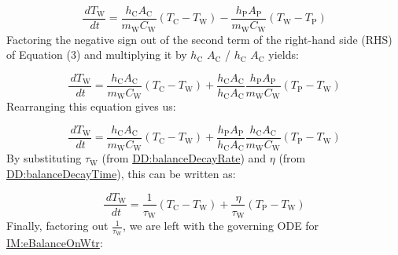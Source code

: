 \documentclass[12pt]{article}
\begin{document}
\begin{displaymath}
\frac{\,d{T_{\text{W}}}}{\,dt}=\frac{{h_{\text{C}}} {A_{\text{C}}}}{{m_{\text{W}}} {C_{\text{W}}}} \left({T_{\text{C}}}-{T_{\text{W}}}\right)-\frac{{h_{\text{P}}} {A_{\text{P}}}}{{m_{\text{W}}} {C_{\text{W}}}} \left({T_{\text{W}}}-{T_{\text{P}}}\right)
\end{displaymath}
Factoring the negative sign out of the second term of the right-hand side (RHS) of Equation (3) and multiplying it by ${h_{\text{C}}}$ ${A_{\text{C}}}$ / ${h_{\text{C}}}$ ${A_{\text{C}}}$ yields:

\begin{displaymath}
\frac{\,d{T_{\text{W}}}}{\,dt}=\frac{{h_{\text{C}}} {A_{\text{C}}}}{{m_{\text{W}}} {C_{\text{W}}}} \left({T_{\text{C}}}-{T_{\text{W}}}\right)+\frac{{h_{\text{C}}} {A_{\text{C}}}}{{h_{\text{C}}} {A_{\text{C}}}} \frac{{h_{\text{P}}} {A_{\text{P}}}}{{m_{\text{W}}} {C_{\text{W}}}} \left({T_{\text{P}}}-{T_{\text{W}}}\right)
\end{displaymath}
Rearranging this equation gives us:

\begin{displaymath}
\frac{\,d{T_{\text{W}}}}{\,dt}=\frac{{h_{\text{C}}} {A_{\text{C}}}}{{m_{\text{W}}} {C_{\text{W}}}} \left({T_{\text{C}}}-{T_{\text{W}}}\right)+\frac{{h_{\text{P}}} {A_{\text{P}}}}{{h_{\text{C}}} {A_{\text{C}}}} \frac{{h_{\text{C}}} {A_{\text{C}}}}{{m_{\text{W}}} {C_{\text{W}}}} \left({T_{\text{P}}}-{T_{\text{W}}}\right)
\end{displaymath}
By substituting ${τ_{\text{W}}}$ (from \hyperref[DD:balanceDecayRate]{DD:balanceDecayRate}) and $η$ (from \hyperref[DD:balanceDecayTime]{DD:balanceDecayTime}), this can be written as:

\begin{displaymath}
\frac{\,d{T_{\text{W}}}}{\,dt}=\frac{1}{{τ_{\text{W}}}} \left({T_{\text{C}}}-{T_{\text{W}}}\right)+\frac{η}{{τ_{\text{W}}}} \left({T_{\text{P}}}-{T_{\text{W}}}\right)
\end{displaymath}
Finally, factoring out $\frac{1}{{τ_{\text{W}}}}$, we are left with the governing ODE for \hyperref[IM:eBalanceOnWtr]{IM:eBalanceOnWtr}:
\end{document}
